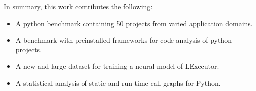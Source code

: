 
In summary, this work contributes the following:
\begin{itemize}
    \item A python benchmark containing 50 projects from varied application domains.
    \item A benchmark with preinstalled frameworks for code analysis of python projects.
    \item A new and large dataset for training a neural model of LExecutor.
    \item A statistical analysis of static and run-time call graphs for Python.
\end{itemize}
